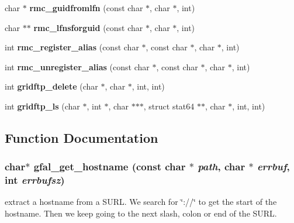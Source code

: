 \begin{CompactItemize}
\item 
char $\ast$ \textbf{rmc\_\-guidfromlfn} (const char $\ast$, char $\ast$, int)\label{group__internal__group_g83a423ba6bb37eda1d1e9fe70cefeea0}

\item 
char $\ast$$\ast$ \textbf{rmc\_\-lfnsforguid} (const char $\ast$, char $\ast$, int)\label{group__internal__group_g7311bb7aa4f897ebf7f91bbb55c81d5b}

\item 
int \textbf{rmc\_\-register\_\-alias} (const char $\ast$, const char $\ast$, char $\ast$, int)\label{group__internal__group_g726824240cad440eb7a60259b9468a40}

\item 
int \textbf{rmc\_\-unregister\_\-alias} (const char $\ast$, const char $\ast$, char $\ast$, int)\label{group__internal__group_g3da248a6139d1cab4b4432793b2df115}

\item 
int \textbf{gridftp\_\-delete} (char $\ast$, char $\ast$, int, int)\label{group__internal__group_g227bf30b43a3fb3ba58d280c4669d558}

\item 
int \textbf{gridftp\_\-ls} (char $\ast$, int $\ast$, char $\ast$$\ast$$\ast$, struct stat64 $\ast$$\ast$, char $\ast$, int, int)\label{group__internal__group_g4c8a3503515b82f59509d89a4a858c9f}

\end{CompactItemize}


\subsection{Function Documentation}
\subsubsection{\setlength{\rightskip}{0pt plus 5cm}char$\ast$ gfal\_\-get\_\-hostname (const char $\ast$ {\em path}, char $\ast$ {\em errbuf}, int {\em errbufsz})}\label{group__internal__group_gfbe1d2da151f9bd6a0ab1ec1abf0ac81}


extract a hostname from a SURL. We search for \char`\"{}://\char`\"{} to get the start of the hostname. Then we keep going to the next slash, colon or end of the SURL. 